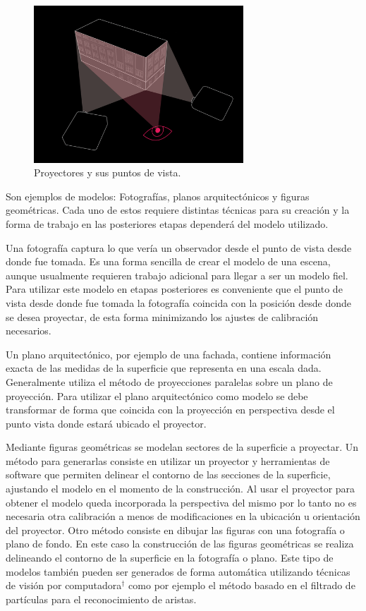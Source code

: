 \begin{figure}[H]
  \centering
    \includegraphics[width=0.7\textwidth]{./Cap2_videomapping/diagrama-2proyectores}
  \caption[vvvv.org]{Proyectores y sus puntos de vista.}
  \label{fig:diagrama-2proyectores}
\end{figure}

Son ejemplos de modelos: Fotografías, planos arquitectónicos y figuras geométricas.
Cada uno de estos requiere distintas técnicas para su creación y la forma de trabajo en las posteriores etapas dependerá del modelo utilizado.

Una fotografía captura lo que vería un observador desde el punto de vista desde donde fue tomada. Es una forma sencilla de crear el modelo de una escena, aunque usualmente requieren trabajo adicional para llegar a ser un modelo fiel. Para utilizar este modelo en etapas posteriores es conveniente que el punto de vista desde donde fue tomada la fotografía coincida con la posición desde donde se desea proyectar, de esta forma minimizando los ajustes de calibración necesarios.

Un plano arquitectónico, por ejemplo de una fachada, contiene información exacta de las medidas de la superficie que representa en una escala dada. Generalmente utiliza el método de proyecciones paralelas \cite{LibroCompGrafica} sobre un plano de proyección. Para utilizar el plano arquitectónico como modelo se debe transformar de forma que coincida con la proyección en perspectiva desde el punto vista donde estará ubicado el proyector.

Mediante figuras geométricas se modelan sectores de la superficie a proyectar. Un método para generarlas consiste en utilizar un proyector y herramientas de software que permiten delinear el contorno de las secciones de la superficie, ajustando el modelo en el momento de la construcción. Al usar el proyector para obtener el modelo queda incorporada la perspectiva del mismo por lo tanto no es necesaria otra calibración a menos de modificaciones en la ubicación u orientación del proyector.
Otro método consiste en dibujar las figuras con una fotografía o plano de fondo. En este caso la construcción de las figuras geométricas se realiza delineando el contorno de la superficie en la fotografía o plano.
Este tipo de modelos también pueden ser generados de forma automática utilizando técnicas de visión por computadora$^\dagger$ como por ejemplo el método basado en el filtrado de partículas\cite{ArticuloAutom2dmodel} para el reconocimiento de aristas.

